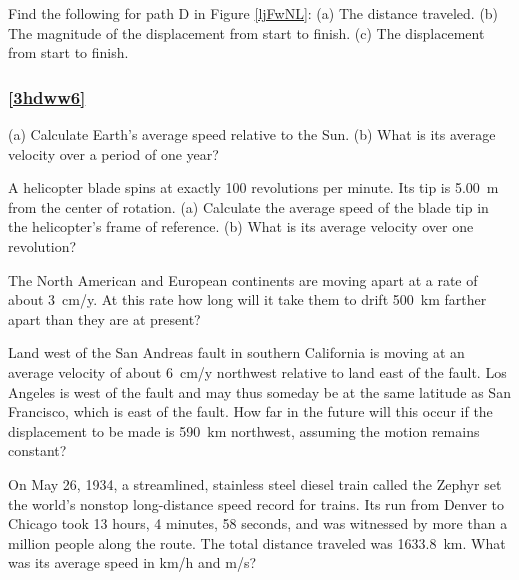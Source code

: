 \documentclass[../../main-ap-physics.tex]{subfiles}
\begin{document}
\begin{exercise}
    Find the following for path D in Figure \ref{ljFwNL}: (a) The distance traveled. (b) The magnitude of the displacement from start to finish. (c) The displacement from start to finish.
\end{exercise}

\subsubsection*{\ref{3hdww6} }

\begin{exercise}
    (a) Calculate Earth's average speed relative to the Sun. (b) What is its average velocity over a period of one year?
\end{exercise}

\begin{exercise}
    A helicopter blade spins at exactly 100 revolutions per minute. Its tip is \SI{5.00}{m} from the center of rotation. (a) Calculate the average speed of the blade tip in the helicopter’s frame of reference. (b) What is its average velocity over one revolution?
\end{exercise}

\begin{exercise}
    The North American and European continents are moving apart at a rate of about \SI{3}{cm/y}. At this rate how long will it take them to drift \SI{500}{km} farther apart than they are at present?
\end{exercise}

\begin{exercise}
    Land west of the San Andreas fault in southern California is moving at an average velocity of about \SI{6}{cm/y} northwest relative to land east of the fault. Los Angeles is west of the fault and may thus someday be at the same latitude as San Francisco, which is east of the fault. How far in the future will this occur if the displacement to be made is \SI{590}{km} northwest, assuming the motion remains constant?
\end{exercise}

\begin{exercise}
    On May 26, 1934, a streamlined, stainless steel diesel train called the Zephyr set the world’s nonstop long-distance speed record for trains. Its run from Denver to Chicago took 13 hours, 4 minutes, 58 seconds, and was witnessed by more than a million people along the route. The total distance traveled was \SI{1633.8}{km}. What was its average speed in km/h and m/s?
\end{exercise}
\end{document}

